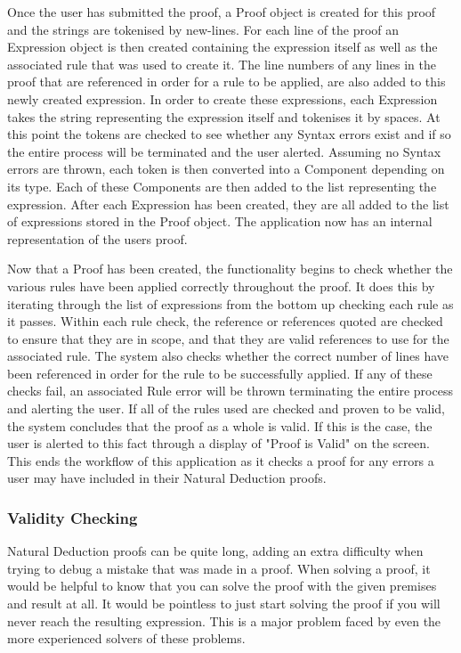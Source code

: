 Once the user has submitted the proof, a Proof object is created for this proof and the strings are tokenised by new-lines. For each line of the proof an Expression object is then created containing the expression itself as well as the associated rule that was used to create it. The line numbers of any lines in the proof that are referenced in order for a rule to be applied, are also added to this newly created expression. In order to create these expressions, each Expression takes the string representing the expression itself and tokenises it by spaces. At this point the tokens are checked to see whether any Syntax errors exist and if so the entire process will be terminated and the user alerted. Assuming no Syntax errors are thrown, each token is then converted into a Component depending on its type. Each of these Components are then added to the list representing the expression. After each Expression has been created, they are all added to the list of expressions stored in the Proof object. The application now has an internal representation of the users proof.

Now that a Proof has been created, the functionality begins to check whether the various rules have been applied correctly throughout the proof. It does this by iterating through the list of expressions from the bottom up checking each rule as it passes. Within each rule check, the reference or references quoted are checked to ensure that they are in scope, and that they are valid references to use for the associated rule. The system also checks whether the correct number of lines have been referenced in order for the rule to be successfully applied. If any of these checks fail, an associated Rule error will be thrown terminating the entire process and alerting the user. If all of the rules used are checked and proven to be valid, the system concludes that the proof as a whole is valid. If this is the case, the user is alerted to this fact through a display of "Proof is Valid" on the screen. This ends the workflow of this application as it checks a proof for any errors a user may have included in their Natural Deduction proofs. 

\subsubsection{Validity Checking \label{validity}}
Natural Deduction proofs can be quite long, adding an extra difficulty when trying to debug a mistake that was made in a proof. When solving a proof, it would be helpful to know that you can solve the proof with the given premises and result at all. It would be pointless to just start solving the proof if you will never reach the resulting expression. This is a major problem faced by even the more experienced solvers of these problems.

